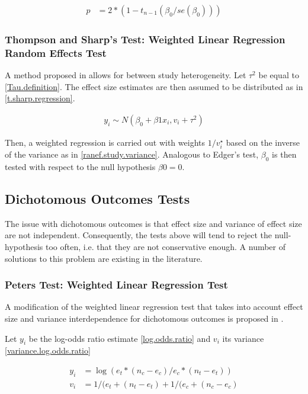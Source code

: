 \documentclass[11pt,a4paper,twoside]{book}\usepackage[]{graphicx}\usepackage[]{color}
\begin{document}
\begin{align}
p &= 2*(1 - t_{n-1}(\beta_{0}/se(\beta_{0}))) \label{egger.pvalue}
\end{align}

\subsubsection{Thompson and Sharp's Test: Weighted Linear Regression Random Effects Test}
A method proposed in \citet{thompson.sharp} allows for between study heterogeneity. Let $\tau^2$ be equal to \ref{Tau.definition}. The effect size estimates are then assumed to be distributed as in \ref{t.sharp.regression}. 

\begin{align}
y_{i} \sim N(\beta_{0} + \beta{1}x_{i}, v_{i} + \tau^2) \label{t.sharp.regression}
\end{align}

Then, a weighted regression is carried out with weights $1/v_{i}^\star$ based on the inverse of the variance as in \ref{ranef.study.variance}. Analogous to Edger's test, $\beta_{0}$ is then tested with respect to the null hypothesis $\beta{0} = 0$.

\subsection{Dichotomous Outcomes Tests}

The issue with dichotomous outcomes is that effect size and variance of effect size are not independent. Consequently, the tests above will tend to reject the null-hypothesis too often, i.e. that they are not conservative enough. A number of solutions to this problem are existing in the literature.


\subsubsection{Peters Test: Weighted Linear Regression Test}
A modification of the weighted linear regression test that takes into account effect size and variance interdependence for dichotomous outcomes is proposed in \citet{Peters}.

\vspace{0mm}
Let $y_i$ be the log-odds ratio estimate \ref{log.odds.ratio} and $v_{i}$ its variance \ref{variance.log.odds.ratio}

\begin{align}
y_{i} &= \log(e_{t}*(n_{c} - e_{c})/e_{c}*(n_{t} - e_{t})) \label{log.odds.ratio}\\
v_{i} &= 1/(e_{t}+(n_{t} - e_{t}) + 1/(e_{c}+(n_{c} - e_{c}) \label{variance.log.odds.ratio}
\end{align}
\end{document}
